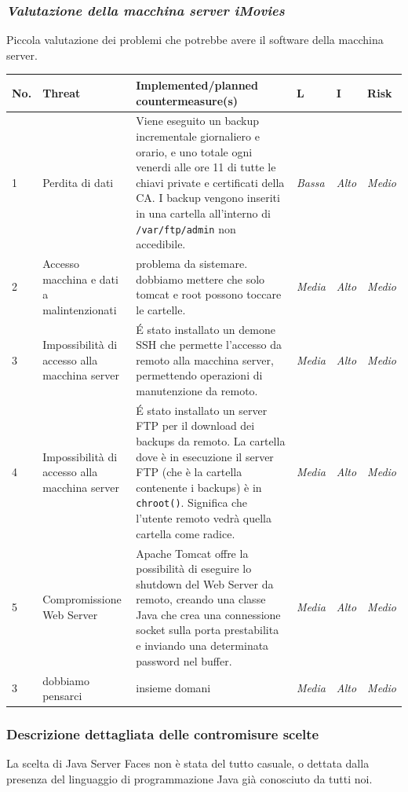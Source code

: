 \documentclass{article}
\begin{document}
\subsubsection{{\it Valutazione della macchina server iMovies}}
Piccola valutazione dei problemi che potrebbe avere il software della macchina server.\\ \noindent
\begin{footnotesize}
\begin{longtable}{p{0.3cm}p{2.3cm}p{5.5cm}p{0.5cm}p{0.5cm}p{0.5cm}}
No. & Threat & Implemented/planned countermeasure(s) & L & I & Risk \\
\hline
1 & Perdita di dati & Viene eseguito un backup incrementale giornaliero e orario, e uno totale ogni venerdi alle ore 11 di tutte le chiavi private e certificati della CA. I backup vengono inseriti in una cartella all'interno di { \tt /var/ftp/admin} non accedibile. & {\it Bassa} & {\it Alto} & {\it Medio} \\
\hline
2 & Accesso macchina e dati a malintenzionati & problema da sistemare. dobbiamo mettere che solo tomcat e root possono toccare le cartelle. & {\it Media} & {\it Alto} & {\it Medio} \\
\hline
3 & Impossibilità di accesso alla macchina server & \'E stato installato un demone SSH che permette l'accesso da remoto alla macchina server, permettendo operazioni di manutenzione da remoto. & {\it Media} & {\it Alto} & {\it Medio} \\
\hline
4 & Impossibilità di accesso alla macchina server & \'E stato installato un server FTP per il download dei backups da remoto. La cartella dove è in esecuzione il server FTP (che è la cartella contenente i backups) è in {\tt chroot()}. Significa che l'utente remoto vedrà quella cartella come radice. & {\it Media} & {\it Alto} & {\it Medio} \\
\hline
5 & Compromissione Web Server & Apache Tomcat offre la possibilità di eseguire lo shutdown del Web Server da remoto, creando una classe Java che crea una connessione socket sulla porta prestabilita e inviando una determinata password nel buffer. & {\it Media} & {\it Alto} & {\it Medio} \\
\hline
3 & dobbiamo pensarci & insieme domani & {\it Media} & {\it Alto} & {\it Medio} \\
\hline
\end{longtable}
\end{footnotesize}

\subsubsection{Descrizione dettagliata delle contromisure scelte}
La scelta di Java Server Faces non è stata del tutto casuale, o dettata dalla presenza del linguaggio di programmazione Java già conosciuto da tutti noi.
\end{document}
